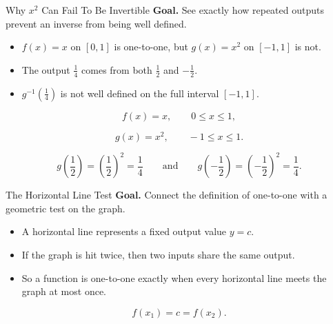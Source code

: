 \documentclass[aspectratio=169]{beamer}
\begin{document}
\begin{frame}[t]{Why \(x^2\) Can Fail To Be Invertible}
\textbf{Goal.} See exactly how repeated outputs prevent an inverse from being well defined.

\begin{itemize}
  \item \(f(x)=x\) on \([0,1]\) is one-to-one, but \(g(x)=x^2\) on \([-1,1]\) is not.
  \item The output \(\frac14\) comes from both \(\frac12\) and \(-\frac12\).
  \item \(g^{-1}\!\left(\frac14\right)\) is not well defined on the full interval \([-1,1]\).
\end{itemize}

\[
f(x)=x, \qquad 0\le x\le 1,
\]

\[
g(x)=x^2, \qquad -1\le x\le 1.
\]

\[
g\left(\frac12\right)=\left(\frac12\right)^2=\frac14
\qquad \text{and} \qquad
g\left(-\frac12\right)=\left(-\frac12\right)^2=\frac14.
\]
\end{frame}

\begin{frame}[t]{The Horizontal Line Test}
\textbf{Goal.} Connect the definition of one-to-one with a geometric test on the graph.

\begin{itemize}
  \item A horizontal line represents a fixed output value \(y=c\).
  \item If the graph is hit twice, then two inputs share the same output.
  \item So a function is one-to-one exactly when every horizontal line meets the graph at most once.
\end{itemize}

\[
f(x_1)=c=f(x_2).
\]
\end{frame}
\end{document}
